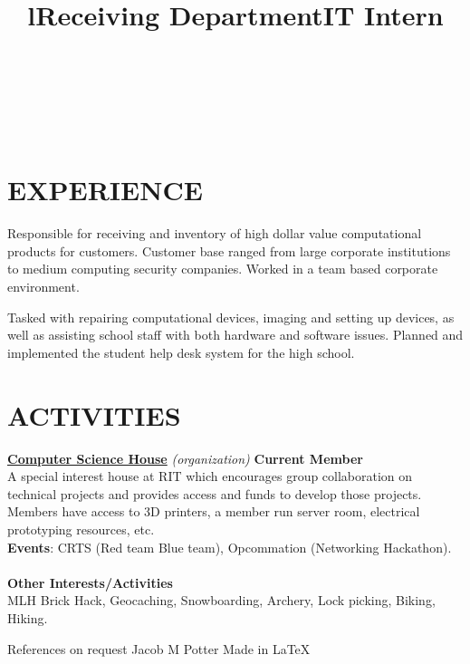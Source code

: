 \documentclass[line,margin]{res}
\begin{document}
\begin{resume}
\begin{format}
\title{l}\\
\\
\body\\
\end{format}
\section{EXPERIENCE}
\title{\textbf{Receiving Department}}
\begin{position}
    Responsible for receiving and inventory of high dollar value 
    computational products for customers. Customer base ranged from large 
    corporate institutions to medium computing security companies. Worked in a
    team based corporate environment.
\end{position}
\title{\textbf{IT Intern}}
\begin{position}
    Tasked with repairing computational devices, imaging and setting up devices, 
    as well as assisting school staff with both hardware and software issues. 
    Planned and implemented the student help desk system for the high 
    school.
\end{position}

\section{ACTIVITIES}
\href{https://csh.rit.edu}{\textbf{Computer Science House}}
{\sl (organization)}\hfill
\textbf{Current Member}\\
A special interest house at RIT which encourages group collaboration on technical 
projects and provides access and funds to develop those projects. Members have 
access to 3D printers, a member run server room, electrical prototyping 
resources, etc.\\
\textbf{Events}: 
CRTS (Red team Blue team), Opcommation (Networking Hackathon).\\\\
\textbf{Other Interests/Activities}\\
MLH Brick Hack, Geocaching, Snowboarding, Archery, Lock picking, Biking, Hiking.

\end{resume}

\scriptsize{References on request} \hfill 
\scriptsize{Jacob M Potter} \hfill 
\scriptsize{Made in \LaTeX}
\end{document}
